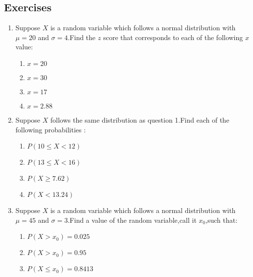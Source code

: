 \subsection{Exercises} \begin{enumerate}
\item   Suppose $X$ is a random variable which follows a normal distribution with $\mu=20$ and $\sigma=4$.Find the $z$ score that corresponds to each of the following $x$ value:

\begin{enumerate}
\item $x=20$
\item $x=30$
\item $x=17$
\item $x=2.88$
\end{enumerate}

\item Suppose $X$ follows the same distribution as question 1.Find each of the following probabilities :

\begin{enumerate}
\item $P(10 \leq X <12)$
\item$P(13 \leq X <16)$
\item $P(X \geq 7.62)$
\item $P(X <13.24)$
\end{enumerate}

\item Suppose $X$ is a random variable which follows a normal distribution with $\mu=45$ and $\sigma=3$.Find a value of the random variable,call it $x_{0}$,such that:

\begin{enumerate}
\item $P(X>x_{0})=0.025$
\item $P(X>x_{0})=0.95$
\item $P(X \leq x_{0})=0.8413$
\end{enumerate}


\end{enumerate}